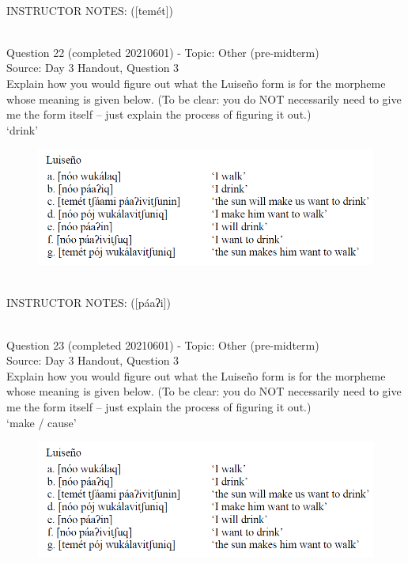 \documentclass[12pt]{article}
\begin{document}
~\\
INSTRUCTOR NOTES: ([temét])


~\\

{\large Question 22} (completed 20210601) - Topic: Other (pre-midterm)\\
Source: Day 3 Handout, Question 3\\

Explain how you would figure out what the Luiseño form is for the morpheme whose meaning is given below. (To be clear: you do NOT necessarily need to give me the form itself -- just explain the process of figuring it out.)\\

‘drink’

\begin{figure}[H]
\includegraphics{../images/luiseno.png}
\end{figure}

~\\
INSTRUCTOR NOTES: ([páaʔi])


~\\

{\large Question 23} (completed 20210601) - Topic: Other (pre-midterm)\\
Source: Day 3 Handout, Question 3\\

Explain how you would figure out what the Luiseño form is for the morpheme whose meaning is given below. (To be clear: you do NOT necessarily need to give me the form itself -- just explain the process of figuring it out.)\\

‘make / cause’

\begin{figure}[H]
\includegraphics{../images/luiseno.png}
\end{figure}
\end{document}
